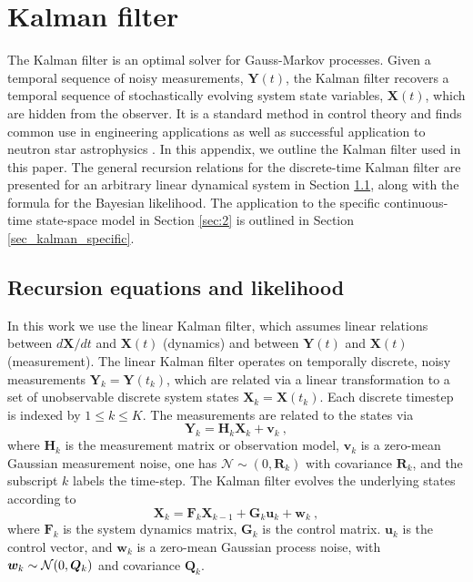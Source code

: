 \documentclass[fleqn,usenatbib,useAMS]{mnras}
\begin{document}
\appendix
\newpage
\newpage
\clearpage


\section{Kalman filter} \label{sec:kalman}
The Kalman filter \citep{Kalman1} is an optimal solver for Gauss-Markov processes. Given a temporal sequence of noisy measurements, $\boldsymbol{Y}(t)$, the Kalman filter recovers a temporal sequence of stochastically evolving system state variables, $\boldsymbol{X}(t)$, which are hidden from the observer. It is a standard method in control theory \citep{zarchan2000fundamentals,rob_KF_book,10.5555/3103280} and finds common use in engineering applications \citep[e.g.][]{KFexample1,KFexample2,KFexample3,KFexample4} as well as successful application to neutron star astrophysics \citep[e.g.][]{Myers2021MNRAS.502.3113M,Meyers2021,Melatos2023}. In this appendix, we outline the Kalman filter used in this paper. The general recursion relations for the discrete-time Kalman filter are presented for an arbitrary linear dynamical system in Section \ref{sec_kalman_general}, along with the formula for the Bayesian likelihood. The application to the specific continuous-time state-space model in Section \ref{sec:2} is outlined in Section \ref{sec_kalman_specific}.


\subsection{Recursion equations and likelihood }\label{sec_kalman_general}
In this work we use the linear Kalman filter, which assumes linear relations between $d{\boldsymbol{X}}/dt$ and ${\boldsymbol{X}}(t)$ (dynamics) and between ${\boldsymbol{Y}}(t)$ and ${\boldsymbol{X}}(t)$ (measurement). The linear Kalman filter operates on temporally discrete, noisy measurements $\boldsymbol{Y}_k = \boldsymbol{Y}(t_k)$, which are related via a linear transformation to a set of unobservable discrete system states $\boldsymbol{X}_k= \boldsymbol{X}(t_k)$. Each discrete timestep is indexed by $ 1 \leq k  \leq K$. The measurements are related to the states via
\begin{equation}
	\boldsymbol{Y}_k = \boldsymbol{H}_k \boldsymbol{X}_k + \boldsymbol{v}_k \ ,\label{eq:kalman1}
\end{equation}
where $\boldsymbol{H}_k$ is the measurement matrix or observation model, $\boldsymbol{v}_k$ is a zero-mean Gaussian measurement noise, one has $\mathcal{N} \sim (0,\boldsymbol{R}_k)$ with covariance $\boldsymbol{R}_k$, and the subscript $k$ labels the time-step. The Kalman filter evolves the underlying states according to
\begin{equation}
	\boldsymbol{X}_k = \boldsymbol{F}_k \boldsymbol{X}_{k-1} + \boldsymbol{G}_k \boldsymbol{u}_k + \boldsymbol{w}_k \ , \label{eq:kalman2}
\end{equation}
where $\boldsymbol{F}_k$ is the system dynamics matrix, $\boldsymbol{G}_k$ is the control matrix. $\boldsymbol{u}_k$ is the control vector, and $\boldsymbol{w}_k$ is a zero-mean Gaussian process 
noise, with $\boldsymbol{w}_k \sim {\cal N}(0, \boldsymbol{Q}_k)$ and covariance $\boldsymbol{Q}_k$. \newline 
\end{document}
